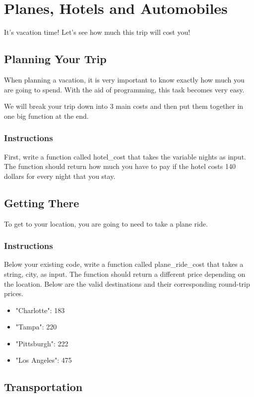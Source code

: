 \documentclass[12pt,a4paper,final,twoside,onecolumn,titlepage]{book}
\begin{document}
\section{Planes, Hotels and Automobiles}
It's vacation time! Let's see how much this trip will cost you!
\subsection{Planning Your Trip}

When planning a vacation, it is very important to know exactly how much you are going to spend. With the aid of programming, this task becomes very easy.

We will break your trip down into 3 main costs and then put them together in one big function at the end.
\subsubsection{Instructions}

First, write a function called hotel\_cost that takes the variable nights as input. The function should return how much you have to pay if the hotel costs 140 dollars for every night that you stay.

\subsection{Getting There}

To get to your location, you are going to need to take a plane ride.
\subsubsection{Instructions}

Below your existing code, write a function called plane\_ride\_cost that takes a string, city, as input. The function should return a different price depending on the location. Below are the valid destinations and their corresponding round-trip prices.
\begin{itemize}
\item "Charlotte": 183
\item "Tampa": 220
\item "Pittsburgh": 222
\item "Los Angeles": 475
\end{itemize}

\subsection{Transportation}
\end{document}
